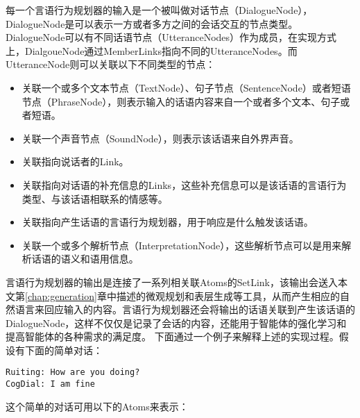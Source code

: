 每一个言语行为规划器的输入是一个被叫做对话节点（DialogueNode），DialogueNode是可以表示一方或者多方之间的会话交互的节点类型。DialogueNode可以有不同话语节点（UtteranceNodes）作为成员，在实现方式上，DialgoueNode通过MemberLinks指向不同的UtteranceNodes。而UtteranceNode则可以关联以下不同类型的节点：
\begin{itemize}
\item 关联一个或多个文本节点（TextNode）、句子节点（SentenceNode）或者短语节点（PhraseNode），则表示输入的话语内容来自一个或者多个文本、句子或者短语。
\item  关联一个声音节点（SoundNode），则表示该话语来自外界声音。
\item  关联指向说话者的Link。
\item  关联指向对话语的补充信息的Links，这些补充信息可以是该话语的言语行为类型、与该话语相联系的情感等。
\item  关联指向产生话语的言语行为规划器，用于响应是什么触发该话语。
\item  关联一个或多个解析节点（InterpretationNode），这些解析节点可以是用来解析话语的语义和语用信息。
\end{itemize}

言语行为规划器的输出是连接了一系列相关联Atoms的SetLink，该输出会送入本文第\ref{chap:generation}章中描述的微观规划和表层生成等工具，从而产生相应的自然语言来回应输入的内容。言语行为规划器还会将输出的话语关联到产生该话语的DialogueNode，这样不仅仅是记录了会话的内容，还能用于智能体的强化学习和提高智能体的各种需求的满足度。
下面通过一个例子来解释上述的实现过程。假设有下面的简单对话：
\begin{verbatim}
Ruiting: How are you doing?
CogDial: I am fine
\end{verbatim}
这个简单的对话可用以下的Atoms来表示：

